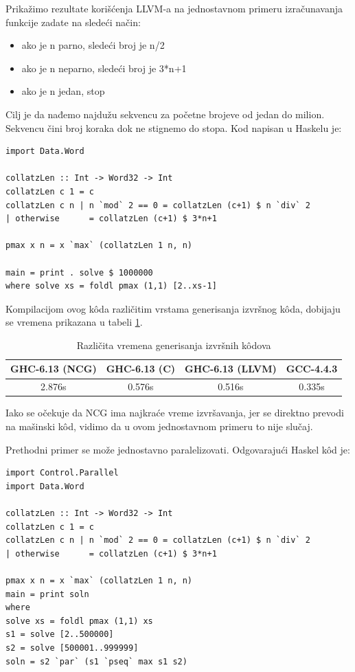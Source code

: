 Prikažimo rezultate korišćenja LLVM-a na jednostavnom primeru izračunavanja funkcije zadate na sledeći način:
\begin{itemize}
	\item ako je n parno, sledeći broj je n/2
	\item ako je n neparno, sledeći broj je 3*n+1
	\item ako je n jedan, stop
\end{itemize}

Cilj je da nađemo najdužu sekvencu za početne brojeve od jedan do milion. Sekvencu čini broj koraka dok ne stignemo do stopa. Kod napisan u Haskelu je:

\begin{verbatim}
import Data.Word

collatzLen :: Int -> Word32 -> Int
collatzLen c 1 = c
collatzLen c n | n `mod` 2 == 0 = collatzLen (c+1) $ n `div` 2
| otherwise      = collatzLen (c+1) $ 3*n+1

pmax x n = x `max` (collatzLen 1 n, n)

main = print . solve $ 1000000
where solve xs = foldl pmax (1,1) [2..xs-1]
\end{verbatim}

Kompilacijom ovog k\^{o}da različitim vrstama generisanja izvršnog k\^{o}da, dobijaju se vremena prikazana u tabeli \ref{tab:vremena}.

\begin{table}[h!]
	\begin{center}
		\caption{Različita vremena generisanja izvršnih k\^{o}dova}
		\begin{tabular}{||c|c|c|c||} \hline
			GHC-6.13 (NCG) & GHC-6.13 (C) & GHC-6.13 (LLVM) & GCC-4.4.3 \\ \hline
			2.876s & 0.576s & 0.516s & 0.335s \\ \hline
		\end{tabular}
		\label{tab:vremena}
	\end{center}
\end{table}


Iako se očekuje da NCG  ima najkraće vreme izvršavanja, jer se direktno prevodi na mašinski k\^{o}d, vidimo da u ovom jednostavnom primeru to nije slučaj.

Prethodni primer se može jednostavno paralelizovati. Odgovarajući Haskel k\^{o}d je:

\begin{verbatim}
import Control.Parallel
import Data.Word

collatzLen :: Int -> Word32 -> Int
collatzLen c 1 = c
collatzLen c n | n `mod` 2 == 0 = collatzLen (c+1) $ n `div` 2
| otherwise      = collatzLen (c+1) $ 3*n+1

pmax x n = x `max` (collatzLen 1 n, n)
main = print soln
where
solve xs = foldl pmax (1,1) xs
s1 = solve [2..500000]
s2 = solve [500001..999999]
soln = s2 `par` (s1 `pseq` max s1 s2)
\end{verbatim}

